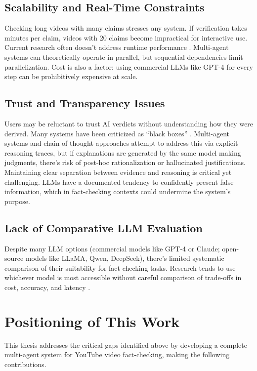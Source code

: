 \documentclass[12pt,a4paper]{article}
\begin{document}
\subsection{Scalability and Real-Time Constraints}

Checking long videos with many claims stresses any system. If verification takes minutes per claim, videos with 20 claims become impractical for interactive use. Current research often doesn't address runtime performance \citep{lin2025factaudit}. Multi-agent systems can theoretically operate in parallel, but sequential dependencies limit parallelization. Cost is also a factor: using commercial LLMs like GPT-4 for every step can be prohibitively expensive at scale.

\subsection{Trust and Transparency Issues}

Users may be reluctant to trust AI verdicts without understanding how they were derived. Many systems have been criticized as ``black boxes'' \citep{wardle2017information}. Multi-agent systems and chain-of-thought approaches attempt to address this via explicit reasoning traces, but if explanations are generated by the same model making judgments, there's risk of post-hoc rationalization or hallucinated justifications. Maintaining clear separation between evidence and reasoning is critical yet challenging. LLMs have a documented tendency to confidently present false information, which in fact-checking contexts could undermine the system's purpose.

\subsection{Lack of Comparative LLM Evaluation}

Despite many LLM options (commercial models like GPT-4 or Claude; open-source models like LLaMA, Qwen, DeepSeek), there's limited systematic comparison of their suitability for fact-checking tasks. Research tends to use whichever model is most accessible without careful comparison of trade-offs in cost, accuracy, and latency \citep{raschka2025llmeval}.

\section{Positioning of This Work}

This thesis addresses the critical gaps identified above by developing a complete multi-agent system for YouTube video fact-checking, making the following contributions.
\end{document}
